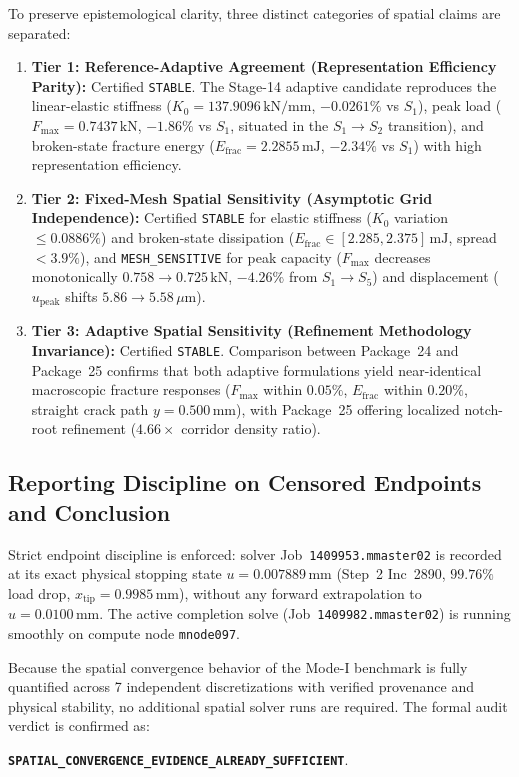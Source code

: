 To preserve epistemological clarity, three distinct categories of spatial claims are separated:
\begin{enumerate}
    \item \textbf{Tier 1: Reference-Adaptive Agreement (Representation Efficiency Parity):} Certified \texttt{STABLE}. The Stage-14 adaptive candidate reproduces the linear-elastic stiffness ($K_0 = 137.9096\,\mathrm{kN/mm}$, $-0.0261\%$ vs $S_1$), peak load ($F_{\max} = 0.7437\,\mathrm{kN}$, $-1.86\%$ vs $S_1$, situated in the $S_1 \to S_2$ transition), and broken-state fracture energy ($E_{\mathrm{frac}} = 2.2855\,\mathrm{mJ}$, $-2.34\%$ vs $S_1$) with high representation efficiency.
    \item \textbf{Tier 2: Fixed-Mesh Spatial Sensitivity (Asymptotic Grid Independence):} Certified \texttt{STABLE} for elastic stiffness ($K_0$ variation $\le 0.0886\%$) and broken-state dissipation ($E_{\mathrm{frac}} \in [2.285, 2.375]\,\mathrm{mJ}$, spread $< 3.9\%$), and \texttt{MESH\_SENSITIVE} for peak capacity ($F_{\max}$ decreases monotonically $0.758 \to 0.725\,\mathrm{kN}$, $-4.26\%$ from $S_1 \to S_5$) and displacement ($u_{\mathrm{peak}}$ shifts $5.86 \to 5.58\,\mu\mathrm{m}$).
    \item \textbf{Tier 3: Adaptive Spatial Sensitivity (Refinement Methodology Invariance):} Certified \texttt{STABLE}. Comparison between Package~24 and Package~25 confirms that both adaptive formulations yield near-identical macroscopic fracture responses ($F_{\max}$ within $0.05\%$, $E_{\mathrm{frac}}$ within $0.20\%$, straight crack path $y=0.500\,\mathrm{mm}$), with Package~25 offering localized notch-root refinement ($4.66\times$ corridor density ratio).
\end{enumerate}

\subsection{Reporting Discipline on Censored Endpoints and Conclusion}
\label{subsec:stage14uu_conclusion}

Strict endpoint discipline is enforced: solver Job~\texttt{1409953.mmaster02} is recorded at its exact physical stopping state $u = 0.007889\,\mathrm{mm}$ (Step~2 Inc~2890, $99.76\%$ load drop, $x_{\mathrm{tip}} = 0.9985\,\mathrm{mm}$), without any forward extrapolation to $u = 0.0100\,\mathrm{mm}$. The active completion solve (Job~\texttt{1409982.mmaster02}) is running smoothly on compute node \texttt{mnode097}.

Because the spatial convergence behavior of the Mode-I benchmark is fully quantified across 7 independent discretizations with verified provenance and physical stability, no additional spatial solver runs are required. The formal audit verdict is confirmed as:
\begin{center}
{\footnotesize\textbf{\texttt{SPATIAL\_CONVERGENCE\_EVIDENCE\_ALREADY\_SUFFICIENT}}}.
\end{center}

